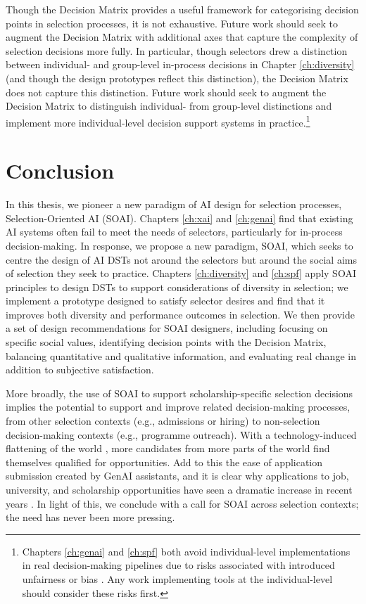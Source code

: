 Though the Decision Matrix provides a useful framework for categorising decision points in selection processes, it is not exhaustive. Future work should seek to augment the Decision Matrix with additional axes that capture the complexity of selection decisions more fully. In particular, though selectors drew a distinction between individual- and group-level in-process decisions in Chapter \ref{ch:diversity} (and though the design prototypes reflect this distinction), the Decision Matrix does not capture this distinction. Future work should seek to augment the Decision Matrix to distinguish individual- from group-level distinctions and implement more individual-level decision support systems in practice.\footnote{Chapters \ref{ch:genai} and \ref{ch:spf} both avoid individual-level implementations in real decision-making pipelines due to risks associated with introduced unfairness or bias \cite{hartigan_fairness_1989,barocas2023fairness,pmlr-v80-kearns18a,Bastounis_Campodonico_vanderSchaar_Adcock_Hansen_2024,liang_gpt_2023}. Any work implementing tools at the individual-level should consider these risks first.}

\section{Conclusion}
In this thesis, we pioneer a new paradigm of AI design for selection processes, Selection-Oriented AI (SOAI). Chapters \ref{ch:xai} and \ref{ch:genai} find that existing AI systems often fail to meet the needs of selectors, particularly for in-process decision-making. In response, we propose a new paradigm, SOAI, which seeks to centre the design of AI DSTs not around the selectors but around the social aims of selection they seek to practice. Chapters \ref{ch:diversity} and \ref{ch:spf} apply SOAI principles to design DSTs to support considerations of diversity in selection; we implement a prototype designed to satisfy selector desires and find that it improves both diversity and performance outcomes in selection. We then provide a set of design recommendations for SOAI designers, including focusing on specific social values, identifying decision points with the Decision Matrix, balancing quantitative and qualitative information, and evaluating real change in addition to subjective satisfaction.

More broadly, the use of SOAI to support scholarship-specific selection decisions implies the potential to support and improve related decision-making processes, from other selection contexts (e.g., admissions or hiring) to non-selection decision-making contexts (e.g., programme outreach). With a technology-induced flattening of the world \cite{Friedman_2005}, more candidates from more parts of the world find themselves qualified for opportunities. Add to this the ease of application submission created by GenAI assistants, and it is clear why applications to job, university, and scholarship opportunities have seen a dramatic increase in recent years \cite{Kaashoek2024Impact}. In light of this, we conclude with a call for SOAI across selection contexts; the need has never been more pressing.